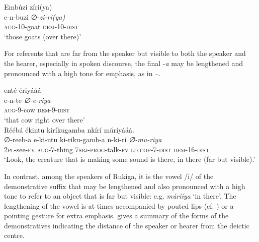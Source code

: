 \documentclass[output=paper 		  ]{langscibook}
\begin{document}
    \ex\label{ex:asiimwe:17b}  Embúzi zíri(ya)\\
    \gll e-n-buzi  ∅{}-\emph{zi-ri(ya)}\\
    \textsc{aug-}10-goat  \textsc{dem-}10-\textsc{dist}\\
    \glt ‘those goats (over there)’
    \z
\z

For referents that are far from the speaker but visible to both the speaker and the hearer, especially in spoken discourse, the final -\textit{a} may be lengthened and pronounced with a high tone for emphasis, as in --.

\ea%
    \label{ex:asiimwe:18}
    enté ériyááá                  \\
 \gll e-n-te  \emph{∅{}-e-riya}\\
  \textsc{aug}{}-9-cow  \textsc{dem-}9-\textsc{dist}\\ 
\glt ‘that cow right over there’
\ex%
    \label{ex:asiimwe:19} \citet[184]{Asiimwe2014}\\
    Réébá ékintu kiríkugamba nkírí múríyááá.            \\
\gll ∅-reeb-a  e-ki-ntu  ki-riku-gamb-a  n-ki-ri  \emph{∅{}-mu-riya}\\
  \textsc{2pl-}see-\textsc{fv}  \textsc{aug}{}-7-thing  \textsc{7sbj-prog}{}-talk-\textsc{fv}  \textsc{ld.cop}{}-7-\textsc{dist}  \textsc{dem-16-dist}\\ 
\glt ‘Look, the creature that is making some sound is there, in there (far but visible).’
\z

In contrast, among the speakers of Rukiga, it is the vowel /i/ of the demonstrative suffix that may be lengthened and also pronounced with a high tone to refer to an object that is far but visible: e.g. \textit{múrííya} ‘in there’. The lengthening of the vowel is at times accompanied by pouted lips (cf. \citealt[59]{MorrisKirwan1972}) or a pointing gesture for extra emphasis.  gives a summary of the forms of the demonstratives indicating the distance of the speaker or hearer from the deictic centre.
\end{document}
